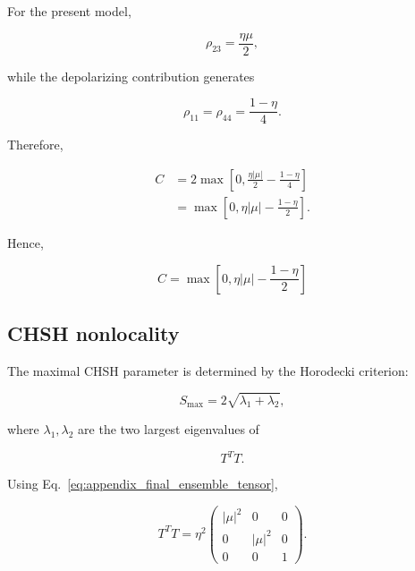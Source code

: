 For the present model,

\begin{equation}
\rho_{23}
=
\frac{\eta\mu}{2},
\end{equation}

while the depolarizing contribution generates

\begin{equation}
\rho_{11}
=
\rho_{44}
=
\frac{1-\eta}{4}.
\end{equation}

Therefore,

\begin{align}
C
&=
2
\max
\left[
0,
\frac{\eta|\mu|}{2}
-
\frac{1-\eta}{4}
\right]
\nonumber
\\
&=
\max
\left[
0,
\eta|\mu|
-
\frac{1-\eta}{2}
\right].
\end{align}

Hence,

\begin{equation}
\boxed{
C
=
\max
\left[
0,
\eta|\mu|
-
\frac{1-\eta}{2}
\right]
}
\label{eq:appendix_ensemble_concurrence}
\end{equation}


\subsection*{CHSH nonlocality}

The maximal CHSH parameter is determined by the Horodecki criterion:

\begin{equation}
S_{\max}
=
2
\sqrt{
\lambda_1+\lambda_2
},
\end{equation}

where \( \lambda_1,\lambda_2 \) are the two largest eigenvalues of

\[
T^TT.
\]

\medskip

Using Eq.~\eqref{eq:appendix_final_ensemble_tensor},

\begin{equation}
T^TT
=
\eta^2
\begin{pmatrix}
|\mu|^2 & 0 & 0
\\
0 & |\mu|^2 & 0
\\
0 & 0 & 1
\end{pmatrix}.
\end{equation}

